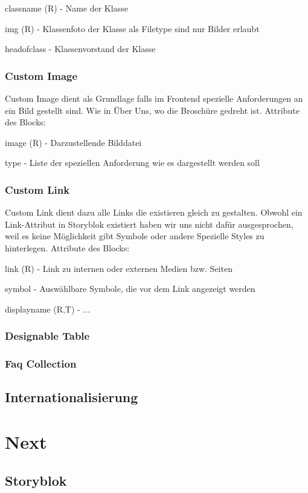 classname (R) - Name der Klasse

img (R) - Klassenfoto der Klasse als Filetype sind nur Bilder erlaubt

headofclass - Klassenvorstand der Klasse

\subsubsection*{Custom Image}
Custom Image dient als Grundlage falls im Frontend spezielle Anforderungen an ein Bild gestellt sind. Wie in Über Uns, wo die Broschüre gedreht ist. Attribute des Blocks:

image (R) - Darzustellende Bilddatei

type - Liste der speziellen Anforderung wie es dargestellt werden soll

\subsubsection*{Custom Link}
Custom Link dient dazu alle Links die existieren gleich zu gestalten. Obwohl ein Link-Attribut in Storyblok existiert haben wir uns nicht dafür ausgesprochen, weil es keine Möglichkeit gibt Symbole oder andere Spezielle Styles zu hinterlegen. Attribute des Blocks:

link (R) - Link zu internen oder externen Medien bzw. Seiten

symbol - Auswählbare Symbole, die vor dem Link angezeigt werden

display\textunderscore name (R,T) - ...

\subsubsection*{Designable Table}

\subsubsection*{Faq Collection}


\subsection{Internationalisierung}

\section{Next}

\subsection{Storyblok}

